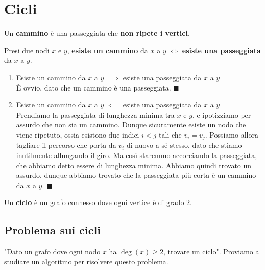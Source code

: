 \documentclass[11pt, a4paper, titlepage, oneside]{scrbook}
\begin{document}
\section{Cicli}

\begin{Definizione}[Cammino]
\label{def-cammino}
Un \textbf{cammino} è una passeggiata che \textbf{non ripete i vertici}.
\end{Definizione}

\begin{Proposizione}[]
\label{propos-cammino}
Presi due nodi $x$ e $y$, \textbf{esiste un cammino} da $x$ a $y$ $\iff$ \textbf{esiste una passeggiata} da $x$ a $y$.
\end{Proposizione}

\Dimostrazione \nopagebreak

\begin{enumerate}[label=\arabic*°]
    \item Esiste un cammino da $x$ a $y$ $\implies$ esiste una passeggiata da $x$ a $y$ \\
    È ovvio, dato che un cammino è una passeggiata. $\blacksquare$
    \item Esiste un cammino da $x$ a $y$ $\impliedby$ esiste una passeggiata da $x$ a $y$ \\
    Prendiamo la passeggiata di lunghezza minima tra $x$ e $y$, e ipotizziamo per assurdo che non sia un cammino. Dunque sicuramente esiste un nodo che viene ripetuto, ossia esistono due indici $i < j$ tali che $v_i = v_j$. Possiamo allora tagliare il percorso che porta da $v_i$ di nuovo a sé stesso, dato che stiamo inutilmente allungando il giro. Ma così staremmo accorciando la passeggiata, che abbiamo detto essere di lunghezza minima. Abbiamo quindi trovato un assurdo, dunque abbiamo trovato che la passeggiata più corta è un cammino da $x$ a $y$. $\blacksquare$
\end{enumerate}

\begin{Definizione}[Ciclo]
\label{def-ciclo}
Un \textbf{ciclo} è un grafo connesso dove ogni vertice è di grado 2.
\end{Definizione}

\subsection{Problema sui cicli}

"Dato un grafo dove ogni nodo $x$ ha $\deg(x) \geq 2$, trovare un ciclo". Proviamo a studiare un algoritmo per risolvere questo problema.
\end{document}
